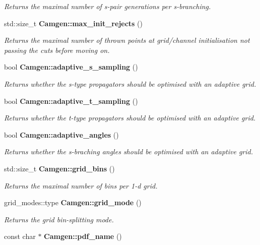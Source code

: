 \begin{DoxyCompactItemize}
\begin{DoxyCompactList}\small\item\em Returns the maximal number of s-\/pair generations per s-\/branching. \end{DoxyCompactList}\item 
std\-::size\-\_\-t {\bfseries Camgen\-::max\-\_\-init\-\_\-rejects} ()
\begin{DoxyCompactList}\small\item\em Returns the maximal number of thrown points at grid/channel initialisation not passing the cuts before moving on. \end{DoxyCompactList}\item 
bool {\bfseries Camgen\-::adaptive\-\_\-s\-\_\-sampling} ()
\begin{DoxyCompactList}\small\item\em Returns whether the s-\/type propagators should be optimised with an adaptive grid. \end{DoxyCompactList}\item 
bool {\bfseries Camgen\-::adaptive\-\_\-t\-\_\-sampling} ()
\begin{DoxyCompactList}\small\item\em Returns whether the t-\/type propagators should be optimised with an adaptive grid. \end{DoxyCompactList}\item 
bool {\bfseries Camgen\-::adaptive\-\_\-angles} ()
\begin{DoxyCompactList}\small\item\em Returns whether the s-\/braching angles should be optimised with an adaptive grid. \end{DoxyCompactList}\item 
\hypertarget{a00849_a909bd9954cd0132a45102c5fca15e259}{std\-::size\-\_\-t {\bfseries Camgen\-::grid\-\_\-bins} ()}\label{a00849_a909bd9954cd0132a45102c5fca15e259}

\begin{DoxyCompactList}\small\item\em Returns the maximal number of bins per 1-\/d grid. \end{DoxyCompactList}\item 
\hypertarget{a00849_a1f8278cb3de70846a499c98c6b60ff9e}{grid\-\_\-modes\-::type {\bfseries Camgen\-::grid\-\_\-mode} ()}\label{a00849_a1f8278cb3de70846a499c98c6b60ff9e}

\begin{DoxyCompactList}\small\item\em Returns the grid bin-\/splitting mode. \end{DoxyCompactList}\item 
\hypertarget{a00849_ade651df5baf7c473757ff2c69b2d32f5}{const char $\ast$ {\bfseries Camgen\-::pdf\-\_\-name} ()}\label{a00849_ade651df5baf7c473757ff2c69b2d32f5}


\end{DoxyCompactItemize}
